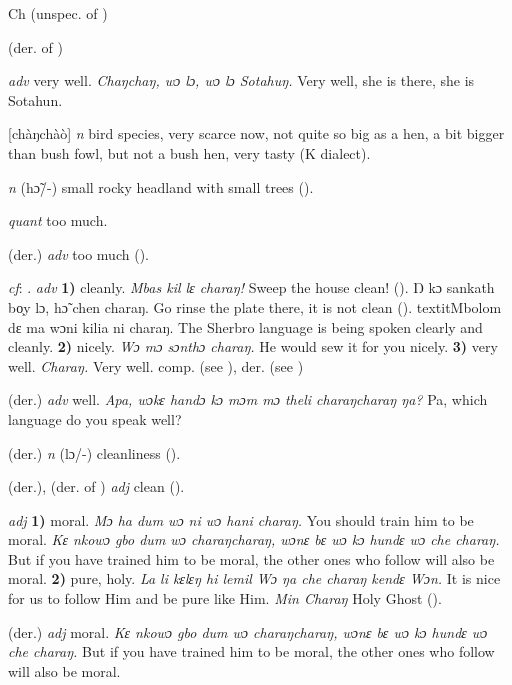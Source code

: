 \begin{letter}{Ch}
 (unspec. of ) 

 (der. of ) 

 \textit{adv} very well. \textit{Chaŋchaŋ, wɔ lɔ, wɔ lɔ Sotahuŋ.} Very well, she is there, she is Sotahun.

 [chàŋchàò] \textit{n} bird species, very scarce now, not quite so big as a hen, a bit bigger than bush fowl, but not a bush hen, very tasty (K dialect). 

 \textit{n} (hɔ̃/-) small rocky headland with small trees (\citealt{Pichl1967}). 

 \textit{quant} too much.

 (der.) \textit{adv} too much (\citealt{Sumner1921}).

 \textit{cf}: . \textit{adv} \textbf{1)} cleanly. \textit{Mbas kil lɛ charaŋ!} Sweep the house clean! (\citealt{Pichl1967}). Ŋ kɔ sankath bo̹y lɔ, hɔ̃ chen charaŋ. Go rinse the plate there, it is not clean (\citealt{Pichl1967}). textit{Mbolom dɛ ma wɔni kilia ni charaŋ.} The Sherbro language is being spoken clearly and cleanly. \textbf{2)} nicely. \textit{Wɔ mɔ sɔnthɔ charaŋ.} He would sew it for you nicely. \textbf{3)} very well. \textit{Charaŋ.} Very well. comp.  (see ), der.  (see ) 

 (der.) \textit{adv} well. \textit{Apa, wɔkɛ handɔ kɔ mɔm mɔ theli charaŋcharaŋ ŋa?} Pa, which language do you speak well?

 (der.) \textit{n} (lɔ/-) cleanliness (\citealt{Pichl1967}).

 (der.), (der. of ) \textit{adj} clean (\citealt{Sumner1921}). 

 \textit{adj} \textbf{1)} moral. \textit{Mɔ ha dum wɔ ni wɔ hani charaŋ.} You should train him to be moral. \textit{Kɛ nkowɔ gbo dum wɔ charaŋcharaŋ, wɔnɛ bɛ wɔ kɔ hundɛ wɔ che charaŋ.} But if you have trained him to be moral, the other ones who follow will also be moral. \textbf{2)} pure, holy. \textit{La li kɛlɛŋ hi lemil Wɔ ŋa che charaŋ kendɛ Wɔn.} It is nice for us to follow Him and be pure like Him. \textit{Min Charaŋ} Holy Ghost (\citealt{Pichl1967}). 

 (der.) \textit{adj} moral. \textit{Kɛ nkowɔ gbo dum wɔ charaŋcharaŋ, wɔnɛ bɛ wɔ kɔ hundɛ wɔ che charaŋ.} But if you have trained him to be moral, the other ones who follow will also be moral.


\end{letter}
